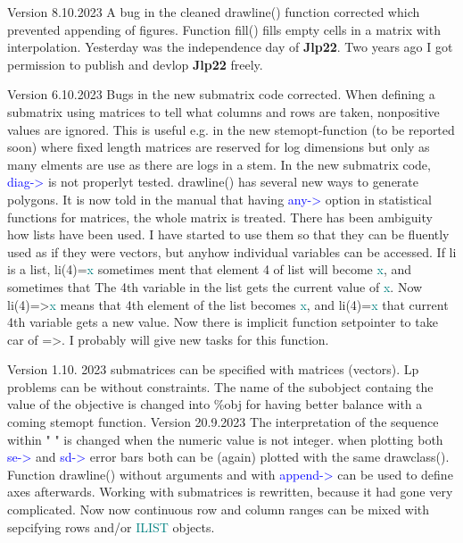 Version 8.10.2023 A bug in the cleaned \textcolor{VioletRed}{drawline}() function corrected which prevented appending of 
figures. Function \textcolor{VioletRed}{fill}() fills empty cells in a matrix with interpolation. 
Yesterday was the independence day of \textbf{Jlp22}. Two years ago I got permission to publish 
and devlop \textbf{Jlp22} freely. 
 
Version 6.10.2023 Bugs in the new submatrix code corrected. When defining a submatrix using matrices to tell 
what columns and rows are taken, nonpositive values are ignored. This is useful e.g. in the new stemopt-function (to be reported soon) 
where fixed length matrices are reserved for log dimensions but only as many elments are use 
as there are logs in a stem. In the new submatrix code, \textcolor{blue}{diag->} is not properlyt tested. 
\textcolor{VioletRed}{drawline}() has several new ways to generate polygons. It is now told in the manual that 
having \textcolor{blue}{any->} option in statistical functions for matrices, the whole matrix is treated. 
There has been ambiguity how lists have been used. I have started to use them so that 
they can be fluently used as if they were vectors, but anyhow individual variables can be accessed. 
If li is a list, li(4)=\textcolor{teal}{x} sometimes ment that element 4 of list will become \textcolor{teal}{x}, and sometimes that 
The 4th variable in the list gets the current value of \textcolor{teal}{x}. Now li(4)=>\textcolor{teal}{x} means that 4th 
element of the list becomes \textcolor{teal}{x}, and li(4)=\textcolor{teal}{x} that current 4th variable gets a new value. 
Now there is implicit function setpointer to take car of =>. 
I probably will give new tasks for this function. 
 
 
 
Version 1.10. 2023 submatrices can be specified with matrices (vectors). Lp problems 
can be without constraints. The name of the subobject containg the value 
of the objective is changed into \%obj for having better balance with a coming stemopt function. 
Version 20.9.2023 The interpretation of the sequence within " " is changed when the numeric value is not integer. 
when plotting both \textcolor{blue}{se->} and \textcolor{blue}{sd->} error bars both can be (again) plotted with the same \textcolor{VioletRed}{drawclass}(). 
Function \textcolor{VioletRed}{drawline}() without arguments and with \textcolor{blue}{append->} can be used to define axes afterwards. 
Working with submatrices is rewritten, because it had gone very complicated. Now now continuous 
row and column ranges can be mixed with sepcifying rows and/or \textcolor{teal}{ILIST} objects. 
 
